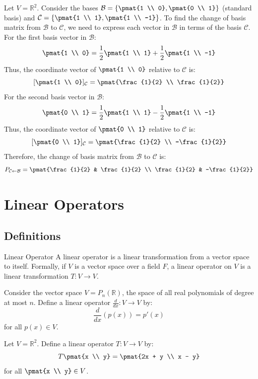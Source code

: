 \documentclass[openany]{book}
\begin{document}
\begin{example}
    Let $V = \mathbb{R}^2$. Consider the bases $\mathcal{B} = \left\{\pmat{1 \\ 0}, \pmat{0 \\ 1}\right\}$ (standard basis) and $\mathcal{C} = \left\{\pmat{1 \\ 1}, \pmat{1 \\ -1}\right\}$. To find the change of basis matrix from $\mathcal{B}$ to $\mathcal{C}$, we need to express each vector in $\mathcal{B}$ in terms of the basis $\mathcal{C}$.
    For the first basis vector in $\mathcal{B}$:
    $$\pmat{1 \\ 0} = \frac{1}{2}\pmat{1 \\ 1} + \frac{1}{2}\pmat{1 \\ -1}$$
    Thus, the coordinate vector of $\pmat{1 \\ 0}$ relative to $\mathcal{C}$ is:
    $$[\pmat{1 \\ 0}]_{\mathcal{C}} = \pmat{\frac{1}{2} \\ \frac{1}{2}}$$
    For the second basis vector in $\mathcal{B}$:
    $$\pmat{0 \\ 1} = \frac{1}{2}\pmat{1 \\ 1} - \frac{1}{2}\pmat{1 \\ -1}$$
    Thus, the coordinate vector of $\pmat{0 \\ 1}$ relative to $\mathcal{C}$ is:
    $$[\pmat{0 \\ 1}]_{\mathcal{C}} = \pmat{\frac{1}{2} \\ -\frac{1}{2}}$$
    Therefore, the change of basis matrix from $\mathcal{B}$ to $\mathcal{C}$ is:
    $$P_{\mathcal{C} \leftarrow \mathcal{B}} = \pmat{\frac{1}{2} & \frac{1}{2} \\ \frac{1}{2} & -\frac{1}{2}}$$
\end{example}
\section{Linear Operators}
\subsection{Definitions}
\begin{mydefinition}{Linear Operator}
    A linear operator is a linear transformation from a vector space to itself. Formally, if $V$ is a vector space over a field $F$, a linear operator on $V$ is a linear transformation $T: V \to V$.
\end{mydefinition}
\begin{example}
    Consider the vector space $V = P_n(\mathbb{R})$, the space of all real polynomials of degree at most $n$. Define a linear operator $\frac{d}{dx}: V \to V$ by:
    $$\frac{d}{dx}(p(x)) = p'(x)$$
    for all $p(x) \in V$. 
\end{example}
\begin{example}
    Let $V = \mathbb{R}^2$. Define a linear operator $T: V \to V$ by:
    $$T\pmat{x \\ y} = \pmat{2x + y \\ x - y}$$
    for all $\pmat{x \\ y} \in V$.
\end{example}
\end{document}
